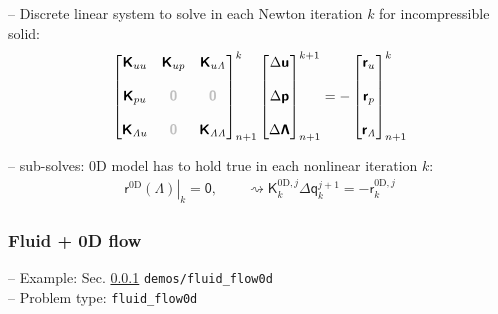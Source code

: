 \documentclass[a4paper,12pt]{report}
\newcommand{\bs}[1]{\boldsymbol{#1}}
\newcommand{\zerom}{\textcolor{lightgray}{\bs{\mathsf{0}}}}
\newcommand{\ROP}{\bs{\mathsf{r}}}
\newcommand{\LMZ}{\bs{\mathsf{\Lambda}}}
\newcommand{\lmzi}{\mathit{\Lambda}} %
\begin{document}
-- Discrete linear system to solve in each Newton iteration $k$ for incompressible solid:
\begin{equation}
\label{equation-lin-sys-solid-inc-0d}
\begin{aligned}
\begin{bmatrix} \bs{\mathsf{K}}_{uu} & \bs{\mathsf{K}}_{up} & \bs{\mathsf{K}}_{u\lmzi} \\ \\ \bs{\mathsf{K}}_{pu} & \zerom & \zerom \\ \\  \bs{\mathsf{K}}_{\lmzi u} & \zerom & \bs{\mathsf{K}}_{\lmzi\lmzi}\end{bmatrix}_{n+1}^{k}\begin{bmatrix} \Delta\bs{\mathsf{u}} \\ \\ \Delta\bs{\mathsf{p}} \\ \\ \Delta\LMZ \end{bmatrix}_{n+1}^{k+1}=-\begin{bmatrix} \ROP_{u} \\ \\ \ROP_{p} \\ \\ \ROP_{\lmzi}\end{bmatrix}_{n+1}^{k}
\end{aligned}
\end{equation}

-- sub-solves: 0D model has to hold true in each nonlinear iteration $k$:
\begin{equation}
\label{equation-nonlin-lin-sys-0d}
\begin{aligned}
\left.\bs{\mathsf{r}}^{0\mathrm{D}}(\bs{\mathsf{\Lambda}})\right|_{k} = \bs{\mathsf{0}}, \qquad \rightsquigarrow \bs{\mathsf{K}}_{k}^{0\mathrm{D},j}\Delta\bs{\mathsf{q}}_{k}^{j+1} = -\bs{\mathsf{r}}_{k}^{0\mathrm{D},j}
\end{aligned}
\end{equation}

\subsubsection{Fluid + 0D flow}\label{fluid-0d-flow}

-- Example: Sec. \ref{fluid-0d-flow} \verb"demos/fluid_flow0d"\\

-- Problem type: \verb.fluid_flow0d.\\
\end{document}
